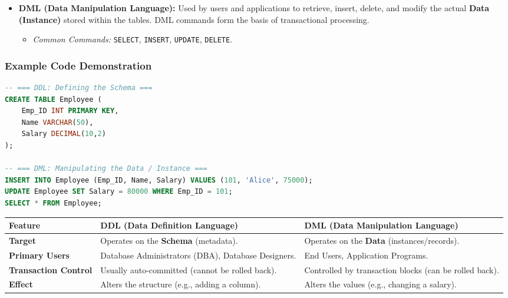 \documentclass[12pt,a3paper]{article}
\begin{document}
\begin{enumerate}
\begin{tcolorbox}[enhanced,breakable,ansbox,colback=cA!4,colframe=cA,boxrule=0.8pt,arc=5pt,title={\textbf{Answer}},fonttitle=\bfseries\color{white},colbacktitle=cA]
\begin{itemize}
    \item \textbf{DML (Data Manipulation Language):} Used by users and applications to retrieve, insert, delete, and modify the actual \textbf{Data (Instance)} stored within the tables. DML commands form the basis of transactional processing.
    \begin{itemize}
        \item \textit{Common Commands:} \texttt{SELECT}, \texttt{INSERT}, \texttt{UPDATE}, \texttt{DELETE}.
    \end{itemize}
\end{itemize}

\subsubsection*{Example Code Demonstration}
\begin{lstlisting}[language=SQL]
-- === DDL: Defining the Schema ===
CREATE TABLE Employee (
    Emp_ID INT PRIMARY KEY,
    Name VARCHAR(50),
    Salary DECIMAL(10,2)
);

-- === DML: Manipulating the Data / Instance ===
INSERT INTO Employee (Emp_ID, Name, Salary) VALUES (101, 'Alice', 75000);
UPDATE Employee SET Salary = 80000 WHERE Emp_ID = 101;
SELECT * FROM Employee;
\end{lstlisting}

\begin{center}
\renewcommand{\arraystretch}{1.4}
\begin{tabularx}{\textwidth}{@{} >{\bfseries}l X X @{}}
\toprule
Feature & DDL (Data Definition Language) & DML (Data Manipulation Language) \\
\midrule
\textbf{Target} & Operates on the \textbf{Schema} (metadata). & Operates on the \textbf{Data} (instances/records). \\
\textbf{Primary Users} & Database Administrators (DBA), Database Designers. & End Users, Application Programs. \\
\textbf{Transaction Control} & Usually auto-committed (cannot be rolled back). & Controlled by transaction blocks (can be rolled back). \\
\textbf{Effect} & Alters the structure (e.g., adding a column). & Alters the values (e.g., changing a salary). \\
\bottomrule
\end{tabularx}
\end{center}

\end{tcolorbox}


\end{enumerate}
\end{document}
